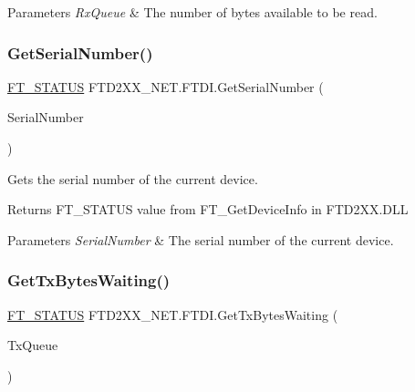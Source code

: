 \begin{DoxyParams}{Parameters}
{\em Rx\+Queue} & The number of bytes available to be read.\\
\hline
\end{DoxyParams}
\mbox{\label{class_f_t_d2_x_x___n_e_t_1_1_f_t_d_i_a38dfb1736759adfbed4e5d536bf73041}} 
\subsubsection{\texorpdfstring{GetSerialNumber()}{GetSerialNumber()}}
{\footnotesize\ttfamily \mbox{\hyperlink{class_f_t_d2_x_x___n_e_t_1_1_f_t_d_i_aabe20ad905cc4ccc1e35dd5b877d9a83}{F\+T\+\_\+\+S\+T\+A\+T\+US}} F\+T\+D2\+X\+X\+\_\+\+N\+E\+T.\+F\+T\+D\+I.\+Get\+Serial\+Number (\begin{DoxyParamCaption}\item[{out string}]{Serial\+Number }\end{DoxyParamCaption})}



Gets the serial number of the current device. 

\begin{DoxyReturn}{Returns}
F\+T\+\_\+\+S\+T\+A\+T\+US value from F\+T\+\_\+\+Get\+Device\+Info in F\+T\+D2\+X\+X.\+D\+LL
\end{DoxyReturn}

\begin{DoxyParams}{Parameters}
{\em Serial\+Number} & The serial number of the current device.\\
\hline
\end{DoxyParams}
\mbox{\label{class_f_t_d2_x_x___n_e_t_1_1_f_t_d_i_aa16dd3f9a92e1f82db5ffe55bd9cb0e3}} 
\subsubsection{\texorpdfstring{GetTxBytesWaiting()}{GetTxBytesWaiting()}}
{\footnotesize\ttfamily \mbox{\hyperlink{class_f_t_d2_x_x___n_e_t_1_1_f_t_d_i_aabe20ad905cc4ccc1e35dd5b877d9a83}{F\+T\+\_\+\+S\+T\+A\+T\+US}} F\+T\+D2\+X\+X\+\_\+\+N\+E\+T.\+F\+T\+D\+I.\+Get\+Tx\+Bytes\+Waiting (\begin{DoxyParamCaption}\item[{ref U\+Int32}]{Tx\+Queue }\end{DoxyParamCaption})}



